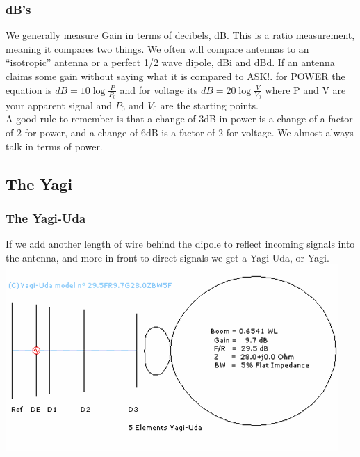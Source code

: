 \documentclass[10pt]{beamer}
\begin{document}
\begin{frame}
\frametitle{dB's}
We generally measure Gain in terms of decibels, dB. This is a ratio measurement, meaning it compares two things. We often will compare antennas to an ``isotropic'' antenna or a perfect 1/2 wave dipole, dBi and dBd. If an antenna claims some gain without saying what it is compared to ASK!. for POWER the equation is $dB=10\log\frac{P}{P_0}$ and for voltage its $dB=20\log\frac{V}{V_0}$ where P and V are your apparent signal and $P_0$ and $V_0$ are the starting points.\\
A good rule to remember is that a change of 3dB in power is a change of a factor of 2 for power, and a change of 6dB is a factor of 2 for voltage. We almost always talk in terms of power.
\end{frame}

\subsection{The Yagi}
\begin{frame}
\frametitle{The Yagi-Uda}
If we add another length of wire behind the dipole to reflect incoming signals into the antenna, and more in front to direct signals we get a Yagi-Uda, or Yagi.\\
\includegraphics[height=.5\textheight]{yagi.png}
\end{frame}
\end{document}
